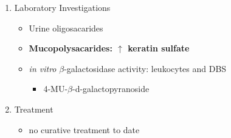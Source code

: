 \documentclass{scrartcl}
\begin{document}
\begin{enumerate}
\item Laboratory Investigations
\label{sec:orgb268850}
\begin{itemize}
\item Urine oligosacarides
\item \textbf{Mucopolysacarides: \(\uparrow\) keratin sulfate}
\item \emph{in vitro} \(\beta\)-galactosidase activity: leukocytes and DBS
\begin{itemize}
\item 4-MU-\(\beta\)-d-galactopyranoside
\end{itemize}
\end{itemize}

\item Treatment
\label{sec:orgea0c118}
\begin{itemize}
\item no curative treatment to date
\end{itemize}
\end{enumerate}
\end{document}
